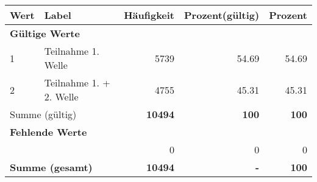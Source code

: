      \begin{longtable}{lXrrr}
     \toprule
     \textbf{Wert} & \textbf{Label} & \textbf{Häufigkeit} & \textbf{Prozent(gültig)} & \textbf{Prozent} \\
     \endhead
     \midrule
     \multicolumn{5}{l}{\textbf{Gültige Werte}}\\

     1 &
     \multicolumn{1}{X}{ Teilnahme 1. Welle   } &


       \num{5739} &
       \num[round-mode=places,round-precision=2]{54.69} &
         \num[round-mode=places,round-precision=2]{54.69} \\

     2 &
     \multicolumn{1}{X}{ Teilnahme 1. + 2. Welle   } &


       \num{4755} &
       \num[round-mode=places,round-precision=2]{45.31} &
         \num[round-mode=places,round-precision=2]{45.31} \\
     \midrule
     \multicolumn{2}{l}{Summe (gültig)} &
       \textbf{\num{10494}} &
     \textbf{\num{100}} &
       \textbf{\num[round-mode=places,round-precision=2]{100}} \\
     \multicolumn{5}{l}{\textbf{Fehlende Werte}}\\
      & & 0 & 0 & 0 \\
     \midrule
     \multicolumn{2}{l}{\textbf{Summe (gesamt)}} &
          \textbf{\num{10494}} &
        \textbf{-} &
        \textbf{\num{100}} \\
     \bottomrule
     \end{longtable}
     
